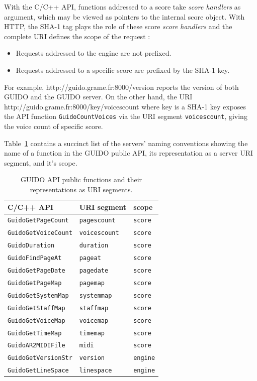\documentclass[11pt,a4paper]{article}
\newenvironment{mcode}		{\vspace{-2mm} \fontsize{10pt}{12pt}\selectfont \verbatim}{\endverbatim\vspace{-2mm}}
\begin{document}
With the C/C++ API, functions addressed to a score take \emph{score handlers} as argument, which may be viewed as pointers to the internal score object. With HTTP, the SHA-1 tag plays the role of these score \emph{score handlers} and the complete URI defines the scope of the request :
\begin{itemize}[noitemsep]
\item Requests addressed to the engine are not prefixed.
\item Requests addressed to a specific score are prefixed by the SHA-1 key.
\end{itemize}
For example,
\begin{mcode}
 http://guido.grame.fr:8000/version
\end{mcode}
reports the version of both GUIDO and the GUIDO server. On the other hand, the URI
\begin{mcode}
 http://guido.grame.fr:8000/key/voicescount
        where key is a SHA-1 key
\end{mcode}
exposes the API function \verb=GuidoCountVoices= via the URI segment \verb=voicescount=, giving the voice count of specific score.\par
Table~\ref{table:table1} contains a succinct list of the servers' naming conventions showing the name of a function in the GUIDO public API, its representation as a server URI segment, and it's scope.
\begin{table}
\centering
{\small \begin{tabular}{|l|l|l|}\hline
C/C++ API & URI segment & scope \\\hline
\verb=GuidoGetPageCount= & \verb=pagescount= & \verb=score= \\\hline
\verb=GuidoGetVoiceCount= & \verb=voicescount= & \verb=score= \\\hline
\verb=GuidoDuration= & \verb=duration= & \verb=score= \\\hline
\verb=GuidoFindPageAt= & \verb=pageat= & \verb=score= \\\hline
\verb=GuidoGetPageDate= & \verb=pagedate= & \verb=score= \\\hline
\verb=GuidoGetPageMap= & \verb=pagemap= & \verb=score= \\\hline
\verb=GuidoGetSystemMap= & \verb=systemmap= & \verb=score= \\\hline
\verb=GuidoGetStaffMap= & \verb=staffmap= & \verb=score= \\\hline
\verb=GuidoGetVoiceMap= & \verb=voicemap= & \verb=score= \\\hline
\verb=GuidoGetTimeMap= & \verb=timemap= & \verb=score= \\\hline
\verb=GuidoAR2MIDIFile= & \verb=midi= & \verb=score= \\\hline
\verb=GuidoGetVersionStr= & \verb=version= & \verb=engine= \\\hline
\verb=GuidoGetLineSpace= & \verb=linespace= & \verb=engine= \\\hline
\end{tabular}
}
\cprotect\caption{\label{table:table1} GUIDO API public functions and their representations as URI segments.}
\end{table}
\end{document}
